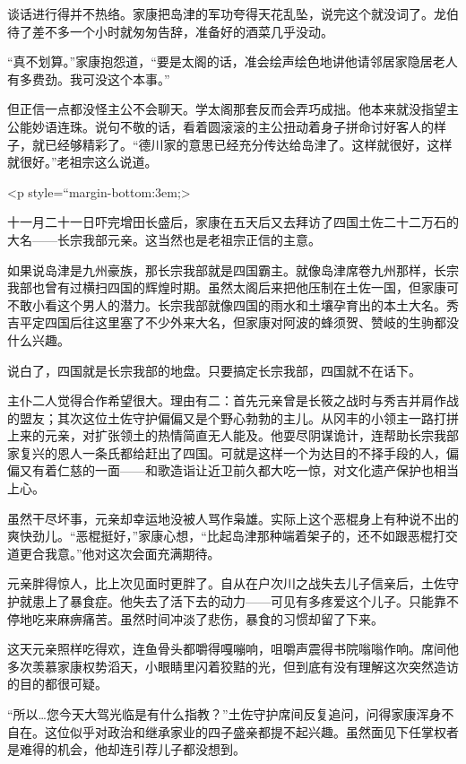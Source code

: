 \documentclass[
]{book}
\begin{document}
谈话进行得并不热络。家康把岛津的军功夸得天花乱坠，说完这个就没词了。龙伯待了差不多一个小时就匆匆告辞，准备好的酒菜几乎没动。

``真不划算。''家康抱怨道，``要是太阁的话，准会绘声绘色地讲他请邻居家隐居老人有多费劲。我可没这个本事。''

但正信一点都没怪主公不会聊天。学太阁那套反而会弄巧成拙。他本来就没指望主公能妙语连珠。说句不敬的话，看着圆滚滚的主公扭动着身子拼命讨好客人的样子，就已经够精彩了。``德川家的意思已经充分传达给岛津了。这样就很好，这样就很好。''老祖宗这么说道。

\textless p style=``margin-bottom:3em;\textgreater{}

十一月二十一日吓完增田长盛后，家康在五天后又去拜访了四国土佐二十二万石的大名------长宗我部元亲。这当然也是老祖宗正信的主意。

如果说岛津是九州豪族，那长宗我部就是四国霸主。就像岛津席卷九州那样，长宗我部也曾有过横扫四国的辉煌时期。虽然太阁后来把他压制在土佐一国，但家康可不敢小看这个男人的潜力。长宗我部就像四国的雨水和土壤孕育出的本土大名。秀吉平定四国后往这里塞了不少外来大名，但家康对阿波的蜂须贺、赞岐的生驹都没什么兴趣。

说白了，四国就是长宗我部的地盘。只要搞定长宗我部，四国就不在话下。

主仆二人觉得合作希望很大。理由有二：首先元亲曾是长筱之战时与秀吉并肩作战的盟友；其次这位土佐守护偏偏又是个野心勃勃的主儿。从冈丰的小领主一路打拼上来的元亲，对扩张领土的热情简直无人能及。他耍尽阴谋诡计，连帮助长宗我部家复兴的恩人一条氏都给赶出了四国。可就是这样一个为达目的不择手段的人，偏偏又有着仁慈的一面------和歌造诣让近卫前久都大吃一惊，对文化遗产保护也相当上心。

虽然干尽坏事，元亲却幸运地没被人骂作枭雄。实际上这个恶棍身上有种说不出的爽快劲儿。``恶棍挺好，''家康心想，``比起岛津那种端着架子的，还不如跟恶棍打交道更合我意。''他对这次会面充满期待。

元亲胖得惊人，比上次见面时更胖了。自从在户次川之战失去儿子信亲后，土佐守护就患上了暴食症。他失去了活下去的动力------可见有多疼爱这个儿子。只能靠不停地吃来麻痹痛苦。虽然时间冲淡了悲伤，暴食的习惯却留了下来。

这天元亲照样吃得欢，连鱼骨头都嚼得嘎嘣响，咀嚼声震得书院嗡嗡作响。席间他多次羡慕家康权势滔天，小眼睛里闪着狡黠的光，但到底有没有理解这次突然造访的目的都很可疑。

``所以\ldots 您今天大驾光临是有什么指教？''土佐守护席间反复追问，问得家康浑身不自在。这位似乎对政治和继承家业的四子盛亲都提不起兴趣。虽然面见下任掌权者是难得的机会，他却连引荐儿子都没想到。
\end{document}
